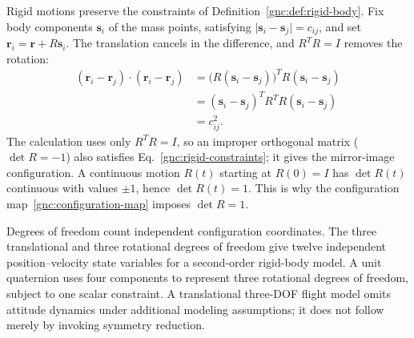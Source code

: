 Rigid motions preserve the constraints of
Definition~\ref{gnc:def:rigid-body}. Fix body components $\mathbf s_i$ of
the mass points, satisfying
$\lvert\mathbf s_i-\mathbf s_j\rvert=c_{ij}$, and set
$\mathbf r_i=\mathbf r+R\mathbf s_i$. The translation cancels in the
difference, and $R^TR=I$ removes the rotation:
\begin{align*}
 (\mathbf r_i-\mathbf r_j)\cdot(\mathbf r_i-\mathbf r_j)
 &=\bigl(R(\mathbf s_i-\mathbf s_j)\bigr)^T R(\mathbf s_i-\mathbf s_j)\\
 &=(\mathbf s_i-\mathbf s_j)^TR^TR(\mathbf s_i-\mathbf s_j)\\
 &=c_{ij}^2.
\end{align*}
The calculation uses only $R^TR=I$, so an improper orthogonal matrix
($\det R=-1$) also satisfies Eq.~\eqref{gnc:rigid-constraints}; it gives the
mirror-image configuration. A continuous motion $R(t)$ starting at $R(0)=I$
has $\det R(t)$ continuous with values $\pm1$, hence $\det R(t)=1$.
This is why the configuration map~\eqref{gnc:configuration-map} imposes
$\det R=1$.

Degrees of freedom count independent configuration coordinates. The
three translational and three rotational degrees of freedom give twelve
independent position--velocity state variables for a second-order rigid-body
model. A unit quaternion uses four components to represent three rotational
degrees of freedom, subject to one scalar constraint. A translational
three-DOF flight model omits attitude dynamics under additional modeling
assumptions; it does not follow merely by invoking symmetry reduction.

